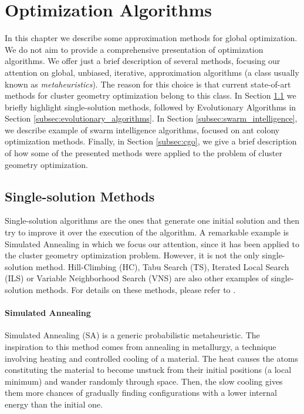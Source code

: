 \chapter{Optimization Algorithms}
	\label{chap:opt_alg}
		
	    In this chapter we describe some approximation methods for global optimization. We do not aim to provide a comprehensive presentation of optimization algorithms. We offer just a brief description of several methods, focusing our attention on global, unbiased, iterative, approximation algorithms (a class usually known as \emph{metaheuristics}). The reason for this choice is that current state-of-art methods for cluster geometry optimization belong to this class. In Section \ref{subsec:single_state_solution} we briefly highlight single-solution methods, followed by Evolutionary Algorithms in Section \ref{subsec:evolutionary_algorithms}. In Section \ref{subsec:swarm_intelligence}, we describe example of swarm intelligence algorithms, focused on ant colony optimization methods. Finally, in Section \ref{subsec:cgo}, we give a brief description of how some of the presented methods were applied to the problem of cluster geometry optimization. 
		\section{Single-solution Methods}
			\label{subsec:single_state_solution}
		 	Single-solution algorithms are the ones that generate one initial solution and then try to improve it over the execution of the algorithm. A remarkable example is Simulated Annealing in which we focus our attention, since it has been applied to the cluster geometry optimization problem. However, it is not the only single-solution method. Hill-Climbing (HC), Tabu Search (TS), Iterated Local Search (ILS) or Variable Neighborhood Search (VNS) are also other examples of single-solution methods. For details on these methods, please refer to \cite{luke09}.  		
			
			\subsubsection*{Simulated Annealing}
			Simulated Annealing (SA) \cite{kirkpatrick83} is a generic probabilistic metaheuristic. The inspiration to this method comes from annealing in metallurgy, a technique involving heating and controlled cooling of a material. The heat causes the atoms constituting the material to become unstuck from their initial positions (a local minimum) and wander randomly through space. Then, the slow cooling gives them more chances of gradually finding configurations with a lower internal energy than the initial one.

